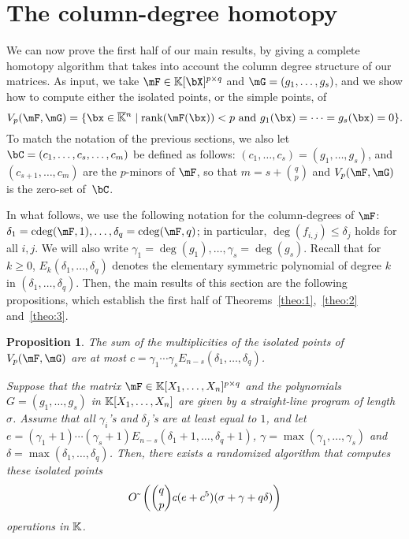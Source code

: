 \documentclass[12pt]{article}
\newtheorem{proposition}[definition]{Proposition}
\begin{document}
\section{The column-degree homotopy}\label{sec:columndegree}

We can now prove the first half of our main results, by giving a
complete homotopy algorithm that takes into account the column degree
structure of our matrices. As input, we take $\mF \in \K[\bX]^{p\times q}$ and $\mG=(g_1,\dots,g_s)$,
and we show how to compute either the isolated points, or
the simple points, of
$$\VpFG{p}{\mF}{\mG} = \{\bx \in \KKbar{}^n \mid
\mathrm{rank}(\mF({\bx})) < p \text{~and~}
g_1(\bx)=\cdots=g_s(\bx)=0\}.$$ 
To match the notation of the previous sections, we also let
$\bC=(c_1,\dots,c_{s},\dots,c_m)$ be defined as follows:
$(c_1,\dots,c_{s})=(g_1,\dots,g_s)$, and $(c_{s+1},\dots,c_{m})$ are
the $p$-minors of $\mF$, so that $m=s+{q \choose p}$ and
$\VpFG{p}{\mF}{\mG}$ is the zero-set of~$\bC$.


In what follows, we use the following notation for the column-degrees
of $\mF$: $\delta_1=\cdeg(\mF,1),\dots,\delta_q=\cdeg(\mF,q)$; in
particular, $\deg(f_{i,j}) \leq \delta_j$ holds for all $i,j$.  We
will also write $\gamma_1=\deg(g_1),\dots,\gamma_s=\deg(g_s)$.  Recall
that for $k\geq 0$, $E_k(\delta_1,\dots,\delta_q)$ denotes the
elementary symmetric polynomial of degree $k$ in $(\delta_1, \ldots,
\delta_q)$. Then, the main results of this section are the following
propositions, which establish the first half of
Theorems~\ref{theo:1},~\ref{theo:2} and~\ref{theo:3}.

\begin{proposition}\label{prop:coldeg}
  The sum
  of the multiplicities of the isolated points of $\VpFG{p}{\mF}{\mG}$
  are at most
  $c=\gamma_1\cdots\gamma_sE_{n-s}(\delta_1, \ldots, \delta_q)$.

  Suppose that the matrix $\mF \in \KK[X_1,\dots,X_n]^{p \times q}$
  and the polynomials $G=(g_1,\dots,g_s)$ in $\mathbb{K}[X_1,\dots,X_n]$ are
  given by a straight-line program of length $\sigma$. 
  Assume that all $\gamma_i$'s and $\delta_j$'s are at least equal to
  $1$, and let
  $e=(\gamma_1+1)\cdots(\gamma_s+1) E_{n-s}(\delta_1+1, \ldots,
  \delta_q+1)$, $\gamma = \max(\gamma_1, \ldots, \gamma_s)$ and
  $\delta = \max(\delta_1, \ldots, \delta_q)$.
  Then, there exists a randomized algorithm that computes these isolated
  points
  $$
  {O}{\,\tilde{ }\,}\left ({q \choose p} c(e+c^5 )(\sigma +\gamma + q
    \delta)\right)
  $$
  operations in $\mathbb{K}$.
\end{proposition}
\end{document}
